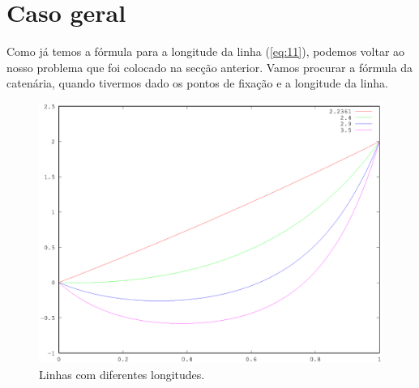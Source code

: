 \section{Caso geral}

Como já temos a fórmula para a longitude da linha (\ref{eq:11}),
podemos voltar ao nosso problema que foi colocado na secção
anterior. Vamos procurar a fórmula da catenária, quando tivermos
dado os pontos de fixação e a longitude da linha.


\begin{figure}
  \vspace{-0.5cm}
  \begin{figurebox}
  \centering
  \includegraphics[width=\textwidth]{catenarias12}
  \caption{Linhas com diferentes longitudes.}
  \label{fig:4}
\end{figurebox}
\vspace{-2cm}
\end{figure}


